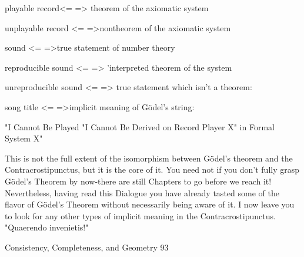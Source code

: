                      playable record<= => theorem of the axiomatic system

                  unplayable record <= =>nontheorem of the axiomatic system

                          sound <= =>true statement of number theory

                  reproducible sound <= => 'interpreted theorem of the system

                unreproducible sound <= => true statement which isn't a theorem:

                       song title <= =>implicit meaning of Gödel’s string:

                       "I Cannot Be Played            "I Cannot Be Derived
                       on Record Player X"            in Formal System X"

        This is not the full extent of the isomorphism between Gödel’s theorem and the
Contracrostipunctus, but it is the core of it. You need not if you don't fully grasp Gödel’s
Theorem by now-there are still Chapters to go before we reach it! Nevertheless, having
read this Dialogue you have already tasted some of the flavor of Gödel’s Theorem
without necessarily being aware of it. I now leave you to look for any other types of
implicit meaning in the Contracrostipunctus. "Quaerendo invenietis!"


Consistency, Completeness, and Geometry                                                  93

